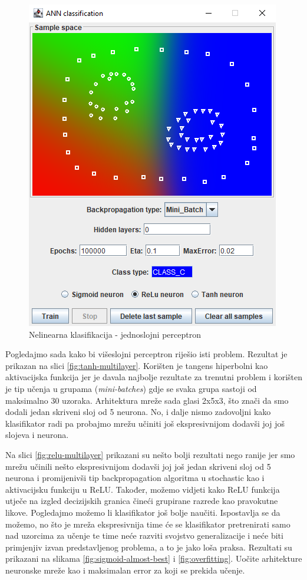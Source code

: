 \documentclass[times, utf8, zavrsni]{fer}
\begin{document}
\begin{figure}[H]
    \centering
    \includegraphics[scale=0.6]{img/single-layer-fail.png}
    \caption[Caption for LOF]{Nelinearna klasifikacija - jednoslojni perceptron}
    \label{fig:single-layer-fail}
\end{figure}

Pogledajmo sada kako bi višeslojni perceptron riješio isti problem. Rezultat je prikazan na slici \ref{fig:tanh-multilayer}. Korišten je tangens hiperbolni kao aktivacijska funkcija jer je davala najbolje rezultate za trenutni problem i korišten je tip učenja u grupama (\textit{mini-batches}) gdje se svaka grupa sastoji od maksimalno 30 uzoraka. Arhitektura mreže sada glasi 2x5x3, što znači da smo dodali jedan skriveni sloj od 5 neurona. No, i dalje nismo zadovoljni kako klasifikator radi pa probajmo mrežu učiniti još ekspresivnijom dodavši joj još slojeva i neurona.

Na slici \ref{fig:relu-multilayer} prikazani su nešto bolji rezultati nego ranije jer smo mrežu učinili nešto ekspresivnijom dodavši joj još jedan skriveni sloj od 5 neurona i promijenivši tip backpropagation algoritma u stochastic kao i aktivacijsku funkciju u ReLU. Također, možemo vidjeti kako ReLU funkcija utječe na izgled decizijskih granica čineći grupirane razrede kao pravokutne likove. Pogledajmo možemo li klasifikator još bolje naučiti. Ispostavlja se da možemo, no što je mreža ekspresivnija time će se klasifikator pretrenirati samo nad uzorcima za učenje te time neće razviti svojstvo generalizacije i neće biti primjenjiv izvan predstavljenog problema, a to je jako loša praksa. Rezultati su prikazani na slikama \ref{fig:sigmoid-almost-best} i \ref{fig:overfitting}. Uočite arhitekture neuronske mreže kao i maksimalan error za koji se prekida učenje.
\end{document}
